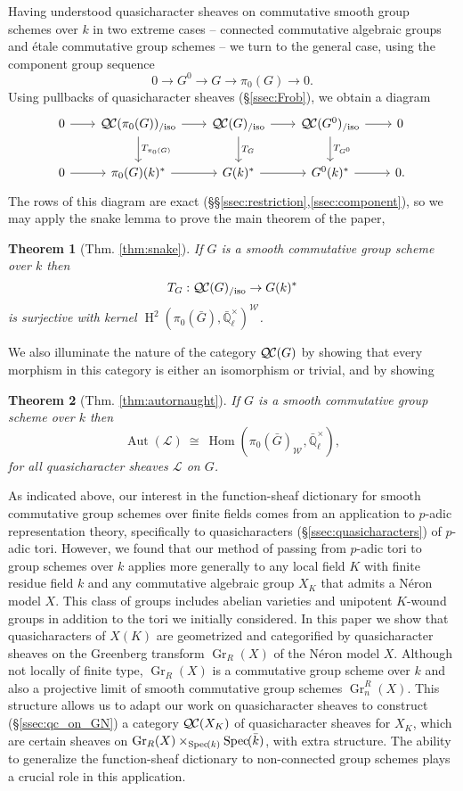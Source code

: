 \documentclass[10pt]{amsart}
\theoremstyle{plain}
\newtheorem*{theorem*}{Theorem}
\theoremstyle{definition}
\theoremstyle{remark}
\newcommand{\EE}{\mathbb{\bar Q}_\ell}
\newcommand{\bFq}{\bar{k}}
\newcommand{\Fq}{k}
\newcommand{\EEx}{\EE^\times}
\newcommand{\Weil}[1]{\mathcal{W}_{#1}}
\DeclareMathOperator{\Aut}{Aut}
\DeclareMathOperator{\Hom}{Hom}
\DeclareMathOperator{\Gr}{Gr}
\DeclareMathOperator{\Hh}{H}
\newcommand{\Spec}[1]{{\operatorname{Spec}\hskip-1pt( #1 )}}
\newcommand{\iso}{{\ \cong\ }}
\newcommand{\TrFrob}[1]{T_{#1}}
\newcommand{\qcs}[1]{{\mathcal{#1}}}
\newcommand{\QC}{{\mathcal{Q\hskip-0.8pt C}}}
\newcommand{\QCiso}[1]{\QC(#1)_{/\text{iso}}}
\newcommand{\bG}{\bar{G}}
\begin{document}
Having understood quasicharacter sheaves on commutative smooth group schemes over $\Fq$ in two extreme cases --
connected commutative algebraic groups and \'etale commutative group schemes -- we turn to the general case, using the component group sequence
\[
0 \to G^0 \to G \to \pi_0(G) \to 0.
\]
Using pullbacks of quasicharacter sheaves (\S\ref{ssec:Frob}), we obtain a diagram
\[
  \begin{tikzcd}[row sep=20, column sep=20]
    0 \rar & \QCiso{\pi_0(G)} \rar \dar{\TrFrob{\pi_0(G)}}
    & \QCiso{G} \rar \dar{\TrFrob{G}} & \QCiso{G^0} \rar \dar{\TrFrob{G^0}} & 0\\
    0 \rar & \pi_0(G)(\Fq)^* \rar & G(\Fq)^* \rar & G^0(\Fq)^* \rar & 0.
  \end{tikzcd}
\]
The rows of this diagram are exact (\S\S\ref{ssec:restriction},\ref{ssec:component}), so we may apply the snake lemma to prove the main theorem of the paper,
\begin{theorem*}[{Thm. \ref{thm:snake}}]
If $G$ is a smooth commutative group scheme over $\Fq$ then
\[
\TrFrob{G} : \QCiso{G} \to G(\Fq)^*
\]
is surjective with kernel $\Hh^2(\pi_0(\bG),\EEx)^{\Weil{}}$.
\end{theorem*}
We also illuminate the nature of the category $\QC(G)$ by showing that every morphism in this category is either an isomorphism or trivial, and by showing
\begin{theorem*}[{Thm. \ref{thm:autornaught}}]
If $G$ is a smooth commutative group scheme over $\Fq$ then
\[
\Aut(\qcs{L}) \iso \Hom(\pi_0(\bG)_{\Weil{}},\EEx),
\]
for all quasicharacter sheaves $\qcs{L}$ on $G$.
\end{theorem*}

As indicated above, our interest in the function-sheaf dictionary for smooth commutative group schemes
over finite fields comes from an application to $p$-adic representation theory,
specifically to quasicharacters (\S\ref{ssec:quasicharacters}) of $p$-adic tori.
However, we found that our method of passing from $p$-adic tori to group schemes over $\Fq$ applies more generally to
any local field $K$ with finite residue field $\Fq$ and any commutative algebraic group $X_K$ that admits a N\'eron model $X$.
This class of groups includes abelian varieties and unipotent $K$-wound groups in addition to the tori we initially considered.
In this paper we show that quasicharacters of $X(K)$ are geometrized and categorified by quasicharacter sheaves on the
Greenberg transform $\Gr_R(X)$ of the N\'eron model $X$.
Although not locally of finite type, $\Gr_R(X)$ is a commutative group scheme over $\Fq$ and also a projective limit of smooth commutative group schemes $\Gr^R_n(X)$.
This structure allows us to adapt our work on quasicharacter sheaves to construct (\S\ref{ssec:qc_on_GN}) a category $\QC(X_K)$
of quasicharacter sheaves for $X_K$, which are certain sheaves on $\Gr_R(X)\times_{\Spec{\Fq}} \Spec{\bFq}$, with extra structure.
The ability to generalize the function-sheaf dictionary to non-connected group schemes plays a crucial role in this application.
\end{document}
